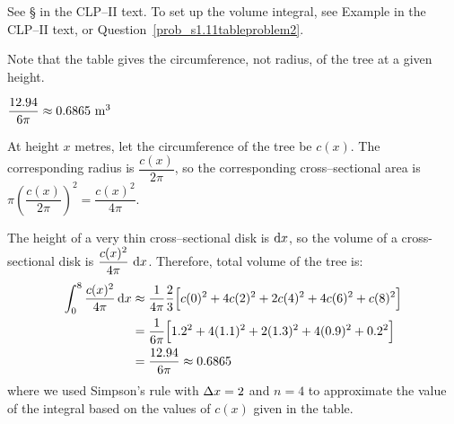 \begin{hint}
See \S{} in the
CLP--II text.
To set up the volume integral, see Example  in the
CLP--II text, or Question~\ref{prob_s1.11tableproblem2}.

Note that the table gives the circumference, not radius, of the tree at a given height.
\end{hint}

\begin{answer}
$\dfrac{12.94}{6\pi}
\approx0.6865\ {\rm m}^3$
\end{answer}

\begin{solution}
At height $x$ metres, let the circumference of the tree be $c(x)$.
The corresponding
radius is $\dfrac{c(x)}{2\pi}$, so the corresponding cross--sectional area
is $\pi\left(\dfrac{c(x)}{2\pi}\right)^2=\dfrac{c(x)^2}{4\pi}$.


\begin{center}
\end{center}

The height of a very thin cross--sectional  disk is $\mathrm{d}x$, so the
volume of a cross-sectional disk is $\dfrac{c(x)^2}{4\pi}~\mathrm{d}x$.
Therefore,
total volume of the tree is:
\begin{align*}
\int_0^8 \frac{c(x)^2}{4\pi}\,\mathrm{d}x
&\approx \frac{1}{4\pi}\frac{2}{3}\Big[c(0)^2+4c(2)^2+2c(4)^2+4c(6)^2+c(8)^2\Big]\cr
&=\frac{1}{6\pi}\Big[1.2^2+4(1.1)^2+2(1.3)^2+4(0.9)^2+0.2^2\Big]\\
&=\frac{12.94}{6\pi}
\approx0.6865
\end{align*}
where we used Simpson's rule with $\Delta x = 2$ and $n=4$ to approximate the value of the integral based on the values of $c(x)$ given in  the table.
\end{solution}

